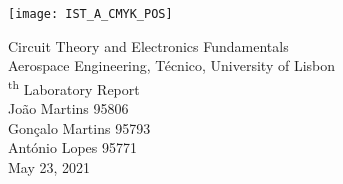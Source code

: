 
\thispagestyle {empty}

\texttt{[image: IST\_A\_CMYK\_POS]}

\begin{center}
%
\vspace{1.0cm}

\vspace{1cm}
{\FontLb Circuit Theory and Electronics Fundamentals} \\ %
\vspace{1cm}
{\FontSn Aerospace Engineering, Técnico, University of Lisbon} \\ %
\vspace{1cm}
{\textsuperscript{th} Laboratory Report} \\
\vspace{1cm}
{\FontSn João Martins 95806} \\
{\FontSn Gonçalo Martins 95793}\\
{\FontSn António Lopes 95771}\\
\vspace{1cm}
{\FontSn May 23, 2021} \\ %
%
\end{center}









